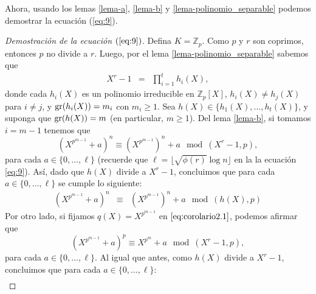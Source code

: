 \documentclass[10pt]{article}
\newcommand{\0}{\mathbf{0}}
\newcommand{\1}{\mathbf{1}}
\newcommand{\modulop}{\mod (X^r-1,p)}
\newcommand{\modulops}{\!\!\mod (X^r-1,p)}
\newcommand{\modulohps}{\!\!\mod (h(X),p)}
\newcommand{\+}{\oplus}
\newcommand{\comentario}[1]{}
\newcommand{\comentarioin}[1]{}
\theoremstyle{remark}
\theoremstyle{remark}
\newcommand{\grado}{{\rm gr}}
\begin{document}
	Ahora, usando los lemas \ref{lema-a}, \ref{lema-b} y \ref{lema-polinomio_separable} podemos demostrar la ecuación (\ref{eq:9}).
	\begin{proof}[Demostración de la ecuación $(\ref{eq:9})$]
		Defina $K = \mathbb{Z}_p$. Como $p$ y $r$ son coprimos, entonces $p$ no divide a $r$. Luego, por el lema \ref{lema-polinomio_separable} sabemos que 
		\begin{eqnarray*}
		X^r-1 & = & \prod_{i=1}^{t}h_i(X),
		\end{eqnarray*}	
		donde cada $h_i(X)$ es un polinomio irreducible en $\mathbb{Z}_p[X]$, $h_i(X)\neq h_j(X)$ para $i\neq j$, y $\grado(h_i(X))=m_i$ con $m_i\geq 1$. Sea $h(X) \in \{h_1(X),...,h_t(X)\}$, y suponga que $\grado(h(X))=m$ (en particular, $m \geq 1$).
                Del lema \ref{lema-b}, si tomamos $i=m-1$ tenemos que $$(X^{p^{m-1}}+a)^n\equiv (X^{p^{m-1}})^n +a \modulops,$$ para cada $a \in \{0, \ldots, \ell\}$ (recuerde que $\ell=\lfloor \sqrt{\phi(r)}\log  n\rfloor$ en la la ecuación \eqref{eq:9}). Así, dado que $h(X)$ divide a $X^r-1$, concluimos que para cada $a \in \{0, \ldots, \ell\}$ se cumple lo siguiente:
		\begin{eqnarray}
		    (X^{p^{m-1}}+a)^n & \equiv & (X^{p^{m-1}})^n +a \modulohps \label{eq:ast} 
		\end{eqnarray}
		Por otro lado, si fijamos $q(X)=X^{p^{m-1}}$ en $\eqref{eq:corolario2.1}$, podemos afirmar que $$(X^{p^{m-1}}+a)^p\equiv X^{p^{m}} +a \modulop,$$ para cada $a \in \{0, \ldots, \ell\}$.  Al igual que antes, como $h(X)$ divide a $X^r-1$, concluimos que para cada $a \in \{0, \ldots, \ell\}$:
		\begin{eqnarray}

\end{eqnarray}
\end{proof}
\end{document}
